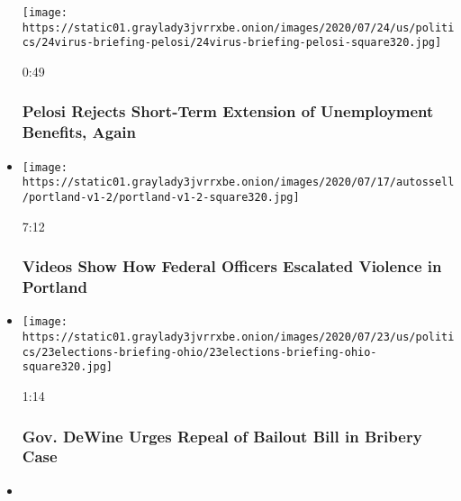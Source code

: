 \begin{itemize}
  \texttt{[image: https://static01.graylady3jvrrxbe.onion/images/2020/07/24/us/politics/24virus-briefing-pelosi/24virus-briefing-pelosi-square320.jpg]}

  0:49

  \hypertarget{pelosi-rejects-short-term-extension-of-unemployment-benefits-again}{%
  \subsubsection{Pelosi Rejects Short-Term Extension of Unemployment
  Benefits,
  Again}\label{pelosi-rejects-short-term-extension-of-unemployment-benefits-again}}
\item
  \href{https://www.nytimes3xbfgragh.onion/video/us/100000007243995/portland-protests-federal-government.html?action=click\&module=video-series-bar\&region=header\&pgtype=Article\&playlistId=video/us-politics}{}

  \texttt{[image: https://static01.graylady3jvrrxbe.onion/images/2020/07/17/autossell/portland-v1-2/portland-v1-2-square320.jpg]}

  7:12

  \hypertarget{videos-show-how-federal-officers-escalated-violence-in-portland}{%
  \subsubsection{Videos Show How Federal Officers Escalated Violence in
  Portland}\label{videos-show-how-federal-officers-escalated-violence-in-portland}}
\item
  \href{https://www.nytimes3xbfgragh.onion/video/us/100000007253892/mike-dewine-repeal-law-bribery-case.html?action=click\&module=video-series-bar\&region=header\&pgtype=Article\&playlistId=video/us-politics}{}

  \texttt{[image: https://static01.graylady3jvrrxbe.onion/images/2020/07/23/us/politics/23elections-briefing-ohio/23elections-briefing-ohio-square320.jpg]}

  1:14

  \hypertarget{gov-dewine-urges-repeal-of-bailout-bill-in-bribery-case}{%
  \subsubsection{Gov. DeWine Urges Repeal of Bailout Bill in Bribery
  Case}\label{gov-dewine-urges-repeal-of-bailout-bill-in-bribery-case}}
\item
  \href{https://www.nytimes3xbfgragh.onion/video/us/100000007253968/trump-cancels-gop-convention.html?action=click\&module=video-series-bar\&region=header\&pgtype=Article\&playlistId=video/us-politics}{}


\end{itemize}
